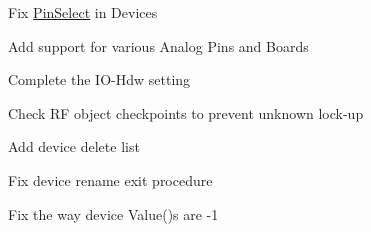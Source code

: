 
\begin{DoxyRefList}
\item[File \mbox{\hyperlink{i_dev_8h}{i\+Dev.h}} ]\label{todo__todo000001}%
%

\begin{DoxyItemize}
\item Fix \mbox{\hyperlink{class_pin_select}{Pin\+Select}} in Devices 
\end{DoxyItemize}
\item[File \mbox{\hyperlink{_a_b_c_8h}{A\+BC.h}} ]\label{todo__todo000002}%
%
 Add support for various Analog Pins and Boards 
\item[File \mbox{\hyperlink{_sys_8h}{Sys.h}} ]\label{todo__todo000003}%
%

\begin{DoxyItemize}
\item Complete the I\+O-\/\+Hdw setting
\item Check \textquotesingle{}RF\textquotesingle{} object checkpoints to prevent unknown lock-\/up
\item Add device delete list
\item Fix device rename exit procedure
\item Fix the way device Value()\textquotesingle{}s are \textquotesingle{}-\/1\textquotesingle{}
\end{DoxyItemize}
\end{DoxyRefList}